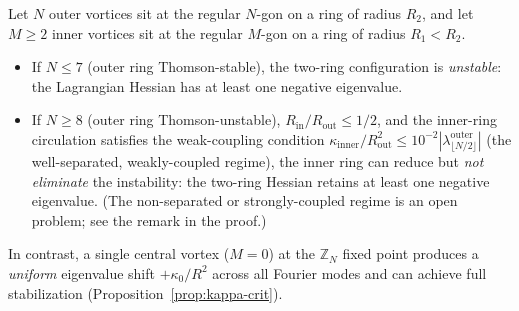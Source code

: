 \begin{proposition}\label{prop:center-ring}
Let $N$ outer vortices sit at the regular $N$-gon on a ring of
radius $R_2$, and let $M \ge 2$ inner vortices sit at the regular
$M$-gon on a ring of radius $R_1 < R_2$.
\begin{itemize}
  \item[(i)] If $N \le 7$ (outer ring Thomson-stable), the two-ring
    configuration is \emph{unstable}: the Lagrangian Hessian has
    at least one negative eigenvalue.
  \item[(ii)] If $N \ge 8$ (outer ring Thomson-unstable),
    $R_{\mathrm{in}}/R_{\mathrm{out}} \le 1/2$, and the
    inner-ring circulation satisfies the weak-coupling condition
    $\kappa_{\mathrm{inner}}/R_{\mathrm{out}}^2
    \le 10^{-2}|\lambda_{\lfloor N/2\rfloor}^{\mathrm{outer}}|$
    (the well-separated, weakly-coupled regime), the inner ring
    can reduce but \emph{not eliminate} the instability: the
    two-ring Hessian retains at least one negative eigenvalue.
    (The non-separated or strongly-coupled regime is an open
    problem; see the remark in the proof.)
\end{itemize}
In contrast, a single central vortex ($M = 0$) at the
$\mathbb{Z}_N$ fixed point produces a \emph{uniform} eigenvalue
shift $+\kappa_0/R^2$ across all Fourier modes and can achieve
full stabilization (Proposition~\ref{prop:kappa-crit}).
\end{proposition}

